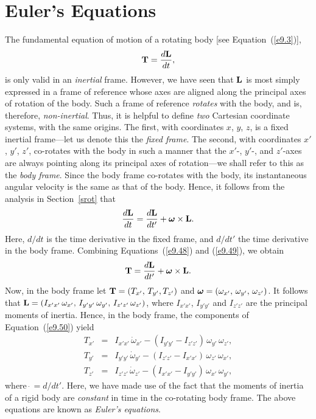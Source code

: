 \section{Euler's Equations}
The fundamental equation of motion of a rotating body [see Equation~(\ref{e9.3})],
\begin{equation}\label{e9.48}
{\bf T} = \frac{d{\bf L}}{dt},
\end{equation}
is only valid in an {\em inertial}\/ frame. However, we have seen that  ${\bf L}$
is most simply expressed in a frame of reference whose axes are aligned
along the principal axes of rotation of the body. Such a frame of reference
{\em rotates}\/ with the body, and is, therefore, {\em non-inertial}. Thus, it is helpful to define {\em two}\/ Cartesian coordinate systems, with the same origins. The first,
with coordinates $x$, $y$, $z$, is a fixed inertial frame---let us denote
this the {\em fixed frame}. The second, with coordinates $x'$, $y'$, $z'$,
co-rotates with the body in such a manner that the $x'$-, $y'$-, and $z'$-axes are always pointing along its principal axes of rotation---we shall
refer to this as the {\em body frame}. Since the body frame co-rotates with the body, its instantaneous angular velocity is the same as that of the
body. Hence, it follows from the analysis in Section~\ref{srot} that
\begin{equation}\label{e9.49}
\frac{d{\bf L}}{dt} = \frac{d{\bf L}}{dt'} + \mbox{\boldmath$\omega$}\times{\bf L}.
\end{equation}
Here, $d/dt$ is the time derivative in the fixed frame, and $d/dt'$ the
time derivative in the body frame.
Combining Equations~(\ref{e9.48}) and (\ref{e9.49}), we obtain
\begin{equation}\label{e9.50}
{\bf T} = \frac{d{\bf L}}{dt'} + \mbox{\boldmath$\omega$}\times{\bf L}.
\end{equation}
Now, in the body frame let ${\bf T}= (T_{x'},\,T_{y'},T_{z'})$ and  $\mbox{\boldmath$\omega$}= (\omega_{x'},\,\omega_{y'},\,\omega_{z'})$.
It follows that
 ${\bf L} =  (I_{x'x'}\,\omega_{x'},\,I_{y'y'}\,\omega_{y'},\,I_{z'z'}\,\omega_{z'})$,
 where $I_{x'x'}$, $I_{y'y'}$ and $I_{z'z'}$ are the principal
 moments of inertia. Hence, in the body frame, the components of Equation~(\ref{e9.50}) yield
 \begin{eqnarray}\label{e9.51}
 T_{x'} &=& I_{x'x'}\,\dot{\omega}_{x'} - (I_{y'y'}-I_{z'z'})\,\omega_{y'}\,\omega_{z'},\\[0.5ex]
 T_{y'} &=& I_{y'y'}\,\dot{\omega}_{y'} - (I_{z'z'}-I_{x'x'})\,\omega_{z'}\,\omega_{x'},\\[0.5ex]
 T_{z'} &=& I_{z'z'}\,\dot{\omega}_{z'} - (I_{x'x'}-I_{y'y'})\,\omega_{x'}\,\omega_{y'},\label{e9.53}
 \end{eqnarray}
 where $\dot{~}=d/dt'$. 
Here, we have made use of the fact that the  moments of inertia
of a rigid body are {\em constant}\/ in time in the co-rotating body frame.
The above equations are known as {\em Euler's equations}.
 
